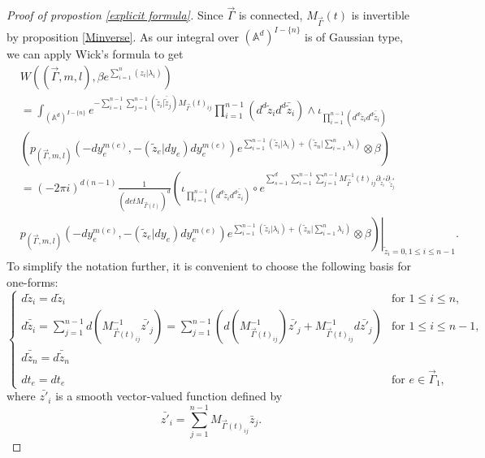 \documentclass[11pt]{amsart}
\theoremstyle{definition}
\theoremstyle{remark}
\numberwithin{equation}{section}
\begin{document}
\begin{proof}[Proof of propostion \ref{explicit formula}]
    Since $\vec{\Gamma}$ is connected, $M_{\vec{\Gamma}}(t)$ is invertible by proposition \ref{Minverse}.
    As our integral over $(\mathbb{A}^d)^{ I-\{n\}}$ is of Gaussian type, we can apply Wick's formula to get
    \begin{align*}
        &W((\vec{\Gamma},m,l),\beta e^{\sum\limits_{i=1}^{n}(z_{i}|\lambda_{i})})\\
        &=\int_{(\mathbb{A}^d)^{ I-\{n\}}}e^{-\sum\limits_{i=1}^{n-1}\sum\limits_{j=1}^{n-1}(\tilde{z}_{i}| \bar{\tilde{z}}_{j})M_{\vec{\Gamma}}(t)_{ij}}\prod_{i=1}^{n-1}(d^{d}\tilde{z}_{i}d^{d}\bar{\tilde{z}}_{i})\wedge \iota_{\prod_{i=1}^{n-1}(d^{d}\tilde{z}_{i}d^{d}\bar{\tilde{z}}_{i})}\\
        &\left(p_{(\vec{\Gamma},m,l)}(-dy_{e}^{m(e)},-(\tilde{z}_{e}|dy_{e})dy_{e}^{m(e)})e^{\sum\limits_{i=1}^{n-1}(\tilde{z}_{i}|\lambda_{i})+(\tilde{z}_{n}|\sum\limits_{i=1}^{n}\lambda_{i})}\otimes \beta\right)\\
        &=(-2\pi i)^{d(n-1)}\frac{1}{(detM_{\vec{\Gamma}(t)})^{d}}\left(
        \iota_{\prod_{i=1}^{n-1}(d^{d}\tilde{z}_{i}d^{d}\bar{\tilde{z}}_{i})}
        \circ
        e^{\sum\limits_{s=1}^{d}\sum\limits_{i=1}^{n-1}\sum\limits_{j=1}^{n-1} M^{-1}_{\vec{\Gamma}}(t)_{ij}\partial_{\tilde{z}_{i}^{s}}\partial_{\bar{\tilde{z}}_{j}^{s}}}
        \right.\\
        &\left.\left.p_{(\vec{\Gamma},m,l)}(-dy_{e}^{m(e)},-(\tilde{z}_{e}| dy_{e})dy_{e}^{m(e)})e^{\sum\limits_{i=1}^{n-1}(\tilde{z}_{i}|\lambda_{i})+(\tilde{z}_{n}|\sum\limits_{i=1}^{n}\lambda_{i})}\otimes \beta\right)\right|_{\tilde{z}_{i}=0,1\leq i\leq n-1}.
    \end{align*}
To simplify the notation further, it is convenient to choose the following basis for one-forms:
    $$
    \begin{cases}
        d\tilde{z}_{i}=d\tilde{z}_{i}&\text{for }1\leq i\leq n,\\
        d\bar{\tilde{z}}_{i}=\sum\limits_{j=1}^{n-1}d\left(
        M^{-1}_{\vec{\Gamma}(t)_{ij}}\bar{z'}_{j}
        \right)=\sum\limits_{j=1}^{n-1}\left(
        d(M^{-1}_{\vec{\Gamma}(t)_{ij}})\bar{z'}_{j}+M^{-1}_{\vec{\Gamma}(t)_{ij}}d\bar{z'}_{j}
        \right) &\text{for }1\leq i\leq n-1,\\
        d\bar{\tilde{z}}_{n}=d\bar{\tilde{z}}_{n}\\
        dt_{e}=dt_{e}&\text{for }e\in\vec{\Gamma}_{1},
    \end{cases}
    $$
    where $\bar{z'}_{i}$ is a smooth vector-valued function defined by
    $$
    \bar{z'}_{i}=\sum_{j=1}^{n-1}M_{\vec{\Gamma}(t)_{ij}}\bar{z}_{j}.
$$
\end{proof}
\end{document}
